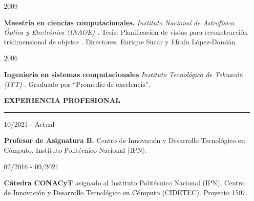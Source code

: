 \documentclass[10pt]{article}
\begin{document}
\begin{minipage}{1.5 in}
	2009\\
\end{minipage}
\begin{minipage}{4.5in}
	\textbf{Maestría en ciencias computacionales.} \textit{Instituto Nacional de Astrofísica Óptica y Electrónica (INAOE) \href{https://www.inaoep.mx/}{\faExternalLink}.} Tesis: Planificación de vistas para reconstrucción tridimensional de objetos \href{https://jivasquez.files.wordpress.com/2015/03/tesis-maestria.pdf}{\faFilePdfO}. Directores: Enrique Sucar y Efraín López-Damián.\\ 
\end{minipage}

\begin{minipage}{1.5 in}
	2006\\
\end{minipage}
\begin{minipage}{4.5in}
	\textbf{Ingeniería en sistemas computacionales} \textit{Instituto Tecnológico de Tehuacán (ITT)} \href{http://www.ittehuacan.edu.mx/}{\faExternalLink}. Graduado por ``Promedio de excelencia".\\ 
\end{minipage} 


{\bf EXPERIENCIA PROFESIONAL}
\vspace{3pt}
\hrule

\begin{minipage}{1.5 in}
	10/2021 - Actual\\
\end{minipage}
\begin{minipage}{4.5in}
	\textbf{Profesor de Asignatura B.} Centro de Innovación y Desarrollo Tecnológico en Cómputo. Instituto Politécnico Nacional (IPN).\\ 
\end{minipage}

\begin{minipage}{1.5 in}
	02/2016 - 09/2021\\
\end{minipage}
\begin{minipage}{4.5in}
	\textbf{Cátedra CONACyT} asignado al Instituto Politécnico Nacional (IPN), Centro de Innovación y Desarrollo Tecnológico en Cómputo (CIDETEC). Proyecto 1507.\\ 
\end{minipage}

\end{document}

